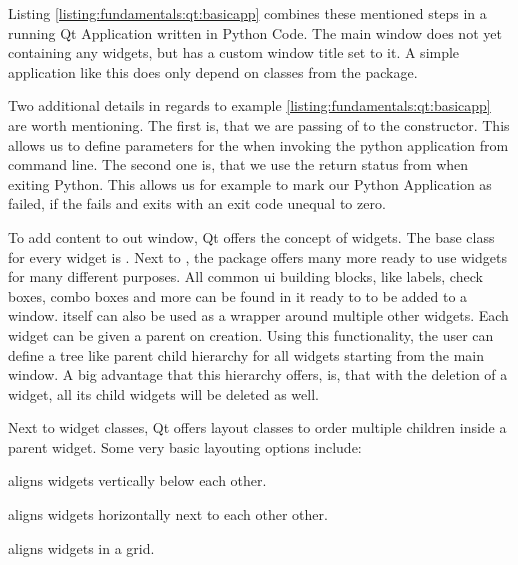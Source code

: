 Listing \ref{listing:fundamentals:qt:basicapp} combines these mentioned steps in
a running Qt Application written in Python Code. The main window does not yet
containing any widgets, but has a custom window title set to it. A simple
application like this does only depend on classes from the
 package.



Two additional details in regards to example
\ref{listing:fundamentals:qt:basicapp} are worth mentioning. The first is, that
we are passing of  to the
 constructor. This allows us to define
parameters for the  when invoking the python
application from command line. The second one is, that we use the return status
from  when exiting Python. This allows us for
example to mark our Python Application as failed, if the
 fails and exits with an exit code unequal to
zero.

To add content to out window, Qt offers the concept of widgets. The base class
for every widget is . Next to
, the package  offers
many more ready to use widgets for many different purposes. All common \gls{ui}
building blocks, like labels, check boxes, combo boxes and more can be found in
it ready to to be added to a window.  itself can
also be used as a wrapper around multiple other widgets. Each widget can be
given a parent on creation. Using this functionality, the user can define a tree
like parent child hierarchy for all widgets starting from the main window. A big
advantage that this hierarchy offers, is, that with the deletion of a widget, all
its child widgets will be deleted as well.

Next to widget classes, Qt offers layout classes to order multiple children
inside a parent widget. Some very basic layouting options include:

\begin{description}

    \item {} aligns widgets vertically
        below each other.
    
    \item {} aligns widgets horizontally
        next to each other other.
    
    \item {} aligns widgets in a grid.

\end{description}

